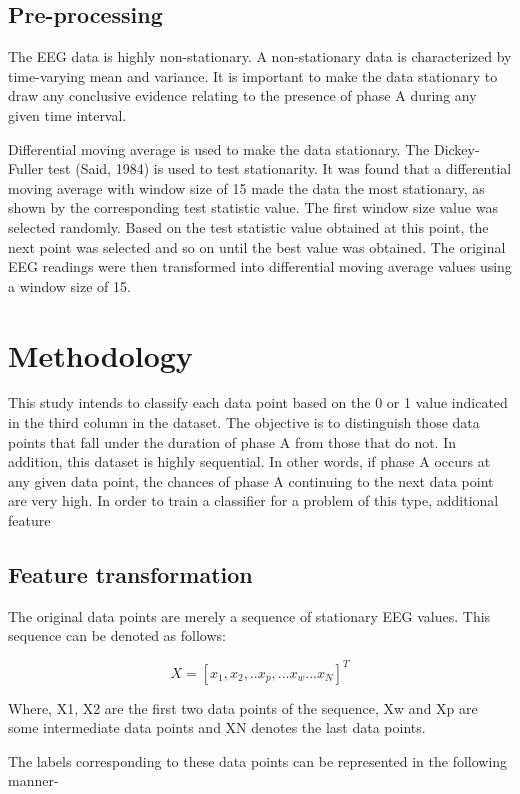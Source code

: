 \documentclass{article}
\begin{document}
\subsection{Pre-processing}

The EEG data is highly non-stationary. A non-stationary data is characterized by time-varying mean and variance. It is important to make the data stationary to draw any conclusive evidence relating to the presence of phase A during any given time interval.

Differential moving average is used to make the data stationary. The Dickey-Fuller test (Said, 1984) is used to test stationarity. It was found that a differential moving average with window size of 15 made the data the most stationary, as shown by the corresponding test statistic value. The first window size value was selected randomly. Based on the test statistic value obtained at this point, the next point was selected and so on until the best value was obtained. The original EEG readings were then transformed into differential moving average values using a window size of 15.

\newcommand{\echar}{e_{\mathrm{char}}}


\section{Methodology}
This study intends to classify each data point based on the 0 or 1 value indicated in the third column in the dataset. The objective is to distinguish those data points that fall under the duration of phase A from those that do not. In addition, this dataset is highly sequential. In other words, if phase A occurs at any given data point, the chances of phase A continuing to the next data point are very high. In order to train a classifier for a problem of this type, additional feature 
\subsection{Feature transformation}
The original data points are merely a sequence of stationary EEG values. This sequence can be denoted as follows:

\[X =  [x_1, x_2,  ..x_p,...x_w... x_N ]^T\]

Where, X1, X2 are the first two data points of the sequence, Xw and Xp are some intermediate data points and XN denotes the last data points.

The labels corresponding to these data points can be represented in the following manner-
\end{document}
